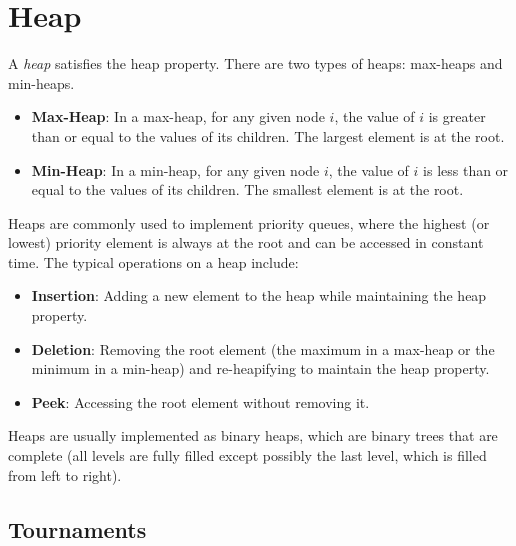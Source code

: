 \section{Heap}

A \emph{heap} satisfies the heap property.
There are two types
of heaps: max-heaps and min-heaps.

\begin{itemize}
    \item \textbf{Max-Heap}: In a max-heap, for any
          given node $i$, the value of $i$ is greater than
          or equal to the values of its children. The
          largest element is at the root.
    \item \textbf{Min-Heap}: In a min-heap, for any
          given node $i$, the value of $i$ is less than or
          equal to the values of its children. The smallest
          element is at the root.
\end{itemize}

Heaps are commonly used to implement priority queues,
where the highest (or lowest) priority element is
always at the root and can be accessed in constant
time. The typical operations on a heap include:

\begin{itemize}
    \item \textbf{Insertion}: Adding a new element to the
          heap while maintaining the heap property.
    \item \textbf{Deletion}: Removing the root element
          (the maximum in a max-heap or the minimum in a min-heap)
          and re-heapifying to maintain the heap property.
    \item \textbf{Peek}: Accessing the root element without
          removing it.
\end{itemize}

Heaps are usually implemented as binary heaps, which are
binary trees that are complete (all levels are fully
filled except possibly the last level, which is filled
from left to right).

\subsection{Tournaments}

